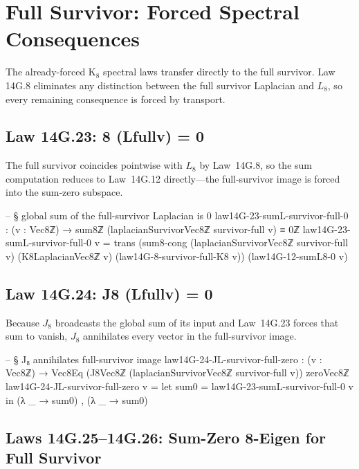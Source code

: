 \documentclass[11pt,a4paper]{book}
\def\Sigma{Sigma}%
\def\Leftrightarrow{<=>}%
\def\mathrm#1{#1}%
\def\texorpdfstring#1#2{#2}%
\begin{document}
\section{Full Survivor: Forced Spectral Consequences}

The already-forced K$_8$ spectral laws transfer directly to the full survivor.
Law 14G.8 eliminates any distinction between the full survivor Laplacian and $L_8$, so every remaining consequence is forced by transport.

\subsection{Law 14G.23: \texorpdfstring{$\Sigma_8 (L_{\mathrm{full}}\,v) = 0$}{8 (Lfullv) = 0}}

The full survivor coincides pointwise with $L_8$ by Law~14G.8, so the sum computation reduces to Law~14G.12 directly---the full-survivor image is forced into the sum-zero subspace.

\begin{code}
-- § global sum of the full-survivor Laplacian is 0
law14G-23-sumL-survivor-full-0 : (v : Vec8ℤ) → sum8ℤ (laplacianSurvivorVec8ℤ survivor-full v) ≡ 0ℤ
law14G-23-sumL-survivor-full-0 v =
  trans
    (sum8-cong (laplacianSurvivorVec8ℤ survivor-full v) (K8LaplacianVec8ℤ v) (law14G-8-survivor-full-K8 v))
    (law14G-12-sumL8-0 v)
\end{code}

\subsection{Law 14G.24: \texorpdfstring{$J_8 (L_{\mathrm{full}}\,v) = 0$}{J8 (Lfullv) = 0}}

Because $J_8$ broadcasts the global sum of its input and Law~14G.23 forces that sum to vanish, $J_8$ annihilates every vector in the full-survivor image.

\begin{code}
-- § J₈ annihilates full-survivor image
law14G-24-JL-survivor-full-zero : (v : Vec8ℤ) → Vec8Eq (J8Vec8ℤ (laplacianSurvivorVec8ℤ survivor-full v)) zeroVec8ℤ
law14G-24-JL-survivor-full-zero v =
  let sum0 = law14G-23-sumL-survivor-full-0 v in
  (λ _ → sum0) , (λ _ → sum0)
\end{code}

\subsection{Laws 14G.25--14G.26: Sum-Zero \texorpdfstring{$\Leftrightarrow$}{} 8-Eigen for Full Survivor}
\end{document}
